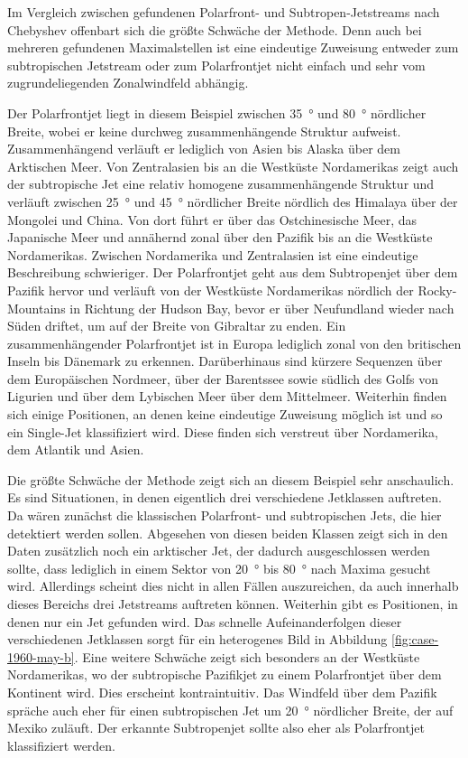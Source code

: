 Im Vergleich zwischen gefundenen Polarfront- und Subtropen-Jetstreams nach Chebyshev offenbart sich die größte Schwäche der Methode. Denn auch bei mehreren gefundenen Maximalstellen ist eine eindeutige Zuweisung entweder zum subtropischen Jetstream oder zum Polarfrontjet nicht einfach und sehr vom zugrundeliegenden Zonalwindfeld abhängig.

Der Polarfrontjet liegt in diesem Beispiel zwischen \SI{35}{\degree} und \SI{80}{\degree} nördlicher Breite, wobei er keine durchweg zusammenhängende Struktur aufweist. Zusammenhängend verläuft er lediglich von Asien bis Alaska über dem Arktischen Meer. Von Zentralasien bis an die Westküste Nordamerikas zeigt auch der subtropische Jet eine relativ homogene zusammenhängende Struktur und verläuft zwischen \SI{25}{\degree} und \SI{45}{\degree} nördlicher Breite nördlich des Himalaya über der Mongolei und China. Von dort führt er über das Ostchinesische Meer, das Japanische Meer und annähernd zonal über den Pazifik bis an die Westküste Nordamerikas. Zwischen Nordamerika und Zentralasien ist eine eindeutige Beschreibung schwieriger. Der Polarfrontjet geht aus dem Subtropenjet über dem Pazifik hervor und verläuft von der Westküste Nordamerikas nördlich der Rocky-Mountains in Richtung der Hudson Bay, bevor er über Neufundland wieder nach Süden driftet, um auf der Breite von Gibraltar zu enden. Ein zusammenhängender Polarfrontjet ist in Europa lediglich zonal von den britischen Inseln bis Dänemark zu erkennen. Darüberhinaus sind kürzere Sequenzen über dem Europäischen Nordmeer, über der Barentssee sowie südlich des Golfs von Ligurien und über dem Lybischen Meer über dem Mittelmeer. Weiterhin finden sich einige Positionen, an denen keine eindeutige Zuweisung möglich ist und so ein Single-Jet klassifiziert wird. Diese finden sich verstreut über Nordamerika, dem Atlantik und Asien.

Die größte Schwäche der Methode zeigt sich an diesem Beispiel sehr anschaulich. Es sind Situationen, in denen eigentlich drei verschiedene Jetklassen auftreten. Da wären zunächst die klassischen Polarfront- und subtropischen Jets, die hier detektiert werden sollen. Abgesehen von diesen beiden Klassen zeigt sich in den Daten zusätzlich noch ein arktischer Jet, der dadurch ausgeschlossen werden sollte, dass lediglich in einem Sektor von \SI{20}{\degree} bis \SI{80}{\degree} nach Maxima gesucht wird. Allerdings scheint dies nicht in allen Fällen auszureichen, da auch innerhalb dieses Bereichs drei Jetstreams auftreten können. Weiterhin gibt es Positionen, in denen nur ein Jet gefunden wird. Das schnelle Aufeinanderfolgen dieser verschiedenen Jetklassen sorgt für ein heterogenes Bild in Abbildung \ref{fig:case-1960-may-b}. Eine weitere Schwäche zeigt sich besonders an der Westküste Nordamerikas, wo der subtropische Pazifikjet zu einem Polarfrontjet über dem Kontinent wird. Dies erscheint kontraintuitiv. Das Windfeld über dem Pazifik spräche auch eher für einen subtropischen Jet um \SI{20}{\degree} nördlicher Breite, der auf Mexiko zuläuft. Der erkannte Subtropenjet sollte also eher als Polarfrontjet klassifiziert werden.

